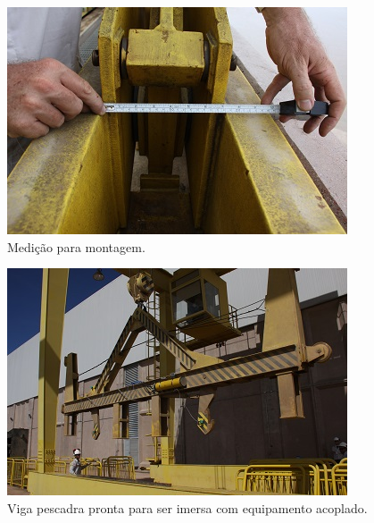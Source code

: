 \begin{figure}[h!]
  \centering
  \includegraphics[width=1\linewidth]{Fotos/Janeiro2015/9.JPG}
  \caption{Medição para montagem.}
  \label{nov20132}
\end{figure}

\begin{figure}[h!]
  \centering
  \includegraphics[width=1\linewidth]{Fotos/Janeiro2015/13.JPG}
  \caption{Viga pescadra pronta para ser imersa com equipamento acoplado.}
  \label{nov20133}
\end{figure}


